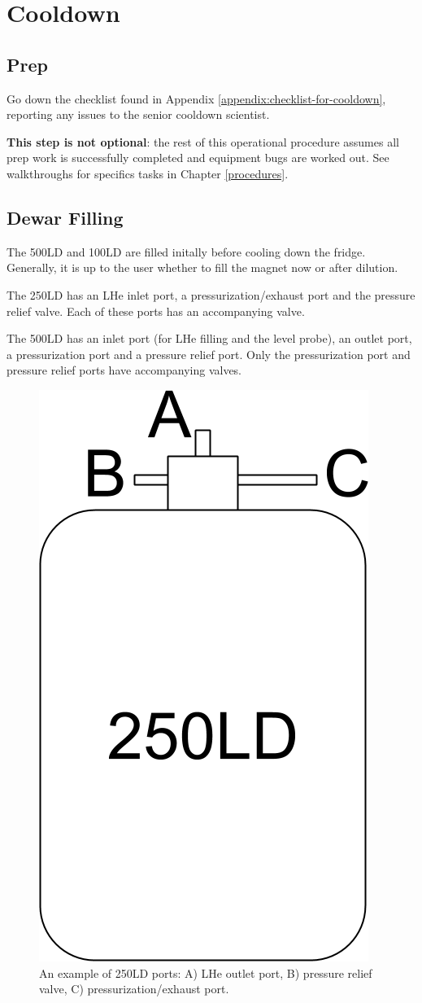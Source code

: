 \section{Cooldown}
\subsection{Prep}
\label{practical-op:prep}
Go down the checklist found in Appendix \ref{appendix:checklist-for-cooldown}, reporting any issues to the senior cooldown scientist.

\textbf{This step is not optional}: the rest of this operational procedure assumes all prep work is successfully completed and equipment bugs are worked out.  See walkthroughs for specifics tasks in Chapter \ref{procedures}.

\subsection{Dewar Filling}
The 500LD and 100LD are filled initally before cooling down the fridge.  Generally, it is up to the user whether to fill the magnet now or after dilution.

The 250LD has an LHe inlet port, a pressurization/exhaust port and the pressure relief valve.  Each of these ports has an accompanying valve.

The 500LD has an inlet port (for LHe filling and the level probe), an outlet port, a pressurization port and a pressure relief port.  Only the pressurization port and pressure relief ports have accompanying valves.


\begin{figure}[h]
\centering
 \includegraphics[width=.25\textwidth]{./img/250LD-cartoon.png}
 \caption{An example of 250LD ports: A) LHe outlet port, B) pressure relief valve, C) pressurization/exhaust port.}
 \label{fig:250LD-cartoon}
\end{figure}


